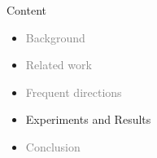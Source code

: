 \documentclass[first=dgreen,second=purple,logo=redque]{aaltoslides}
\begin{document}






\begin{frame}{Content}
\begin{itemize}
\item \textcolor{gray}{Background}
\item \textcolor{gray}{Related work}
\item \textcolor{gray}{Frequent directions}
\item Experiments and Results
\item \textcolor{gray}{Conclusion}
\end{itemize}
\end{frame}


\end{document}

